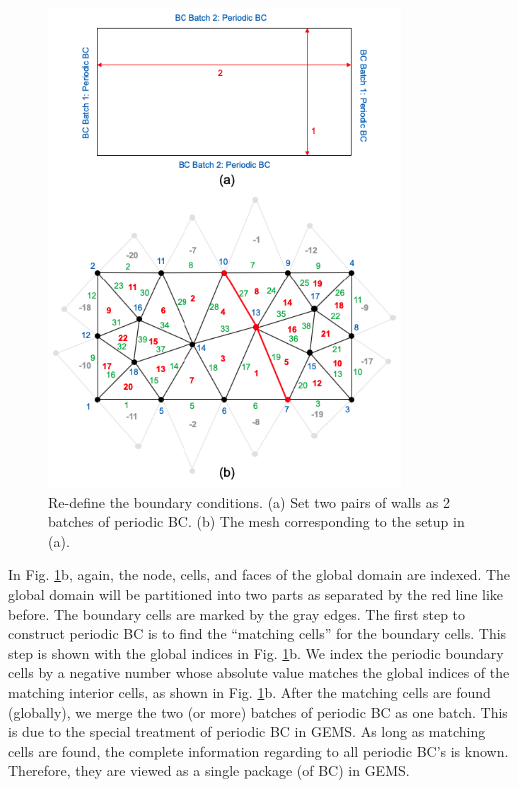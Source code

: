 \documentclass[11pt, letterpaper]{report}
\begin{document}
\begin{figure}[H]
   \centering
   \includegraphics[height=5in]{Mesh5.png}
   \caption{Re-define the boundary conditions. (a) Set two pairs of walls as 2 batches of periodic
   BC. (b) The mesh corresponding to the setup in (a).}
   \label{fig-mesh5}
\end{figure}
\paraspace

In Fig. \ref{fig-mesh5}b, again, the node, cells, and faces of the global domain are indexed. The
global domain will be partitioned into two parts as separated by the red line like before. The
boundary cells are marked by the gray edges. The first step to construct periodic BC is to find the
``matching cells'' for the boundary cells. This step is shown with the global indices in Fig.
\ref{fig-mesh5}b. We index the periodic boundary cells by a negative number whose absolute value
matches the global indices of the matching interior cells, as shown in Fig. \ref{fig-mesh5}b. After
the matching cells are found (globally), we merge the two (or more) batches of periodic BC as one
batch. This is due to the special treatment of periodic BC in GEMS. As long as matching cells are
found, the complete information regarding to all periodic BC's is known. Therefore, they are viewed
as a single package (of BC) in GEMS.  \paraspace
\end{document}
